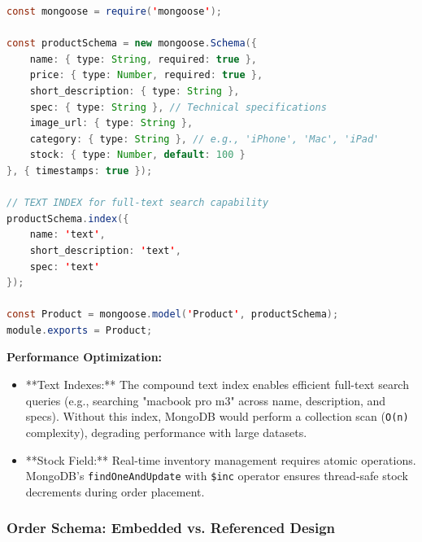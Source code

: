 \documentclass[12pt, a4paper]{report}
\begin{document}
\begin{lstlisting}[language=Java, caption=Product Schema with Search Optimization (model/Product.js)]
const mongoose = require('mongoose');

const productSchema = new mongoose.Schema({
    name: { type: String, required: true },
    price: { type: Number, required: true },
    short_description: { type: String },
    spec: { type: String }, // Technical specifications
    image_url: { type: String },
    category: { type: String }, // e.g., 'iPhone', 'Mac', 'iPad'
    stock: { type: Number, default: 100 }
}, { timestamps: true });

// TEXT INDEX for full-text search capability
productSchema.index({
    name: 'text',
    short_description: 'text',
    spec: 'text'
});

const Product = mongoose.model('Product', productSchema);
module.exports = Product;
\end{lstlisting}

\textbf{Performance Optimization:}
\begin{itemize}
    \item **Text Indexes:** The compound text index enables efficient full-text search queries (e.g., searching "macbook pro m3" across name, description, and specs). Without this index, MongoDB would perform a collection scan (\texttt{O(n)} complexity), degrading performance with large datasets.
    \item **Stock Field:** Real-time inventory management requires atomic operations. MongoDB's \texttt{findOneAndUpdate} with \texttt{\$inc} operator ensures thread-safe stock decrements during order placement.
\end{itemize}

\subsubsection{Order Schema: Embedded vs. Referenced Design}
\end{document}
